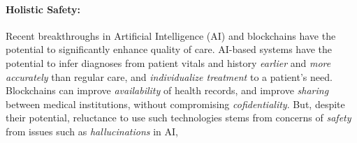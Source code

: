 \paragraph{Holistic Safety:} Recent breakthroughs in Artificial Intelligence
(AI) and blockchains have the potential to significantly enhance quality
of care. AI-based systems have the potential to infer diagnoses from patient
vitals and history \emph{earlier} and \emph{more accurately} than regular
care, and \emph{individualize treatment} to a patient's need. Blockchains
can improve \emph{availability} of health records, and improve
\emph{sharing} between medical institutions, without compromising
\emph{cofidentiality}. But, despite their potential, reluctance to use such technologies stems
from concerns of \emph{safety} from issues such as \emph{hallucinations}
in AI,




